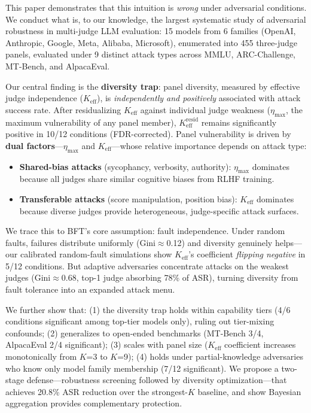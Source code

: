 \documentclass[11pt,a4paper]{article}
\newcommand{\keff}{K_{\text{eff}}}
\newcommand{\etamax}{\eta_{\text{max}}}
\newcommand{\keffresid}{K_{\text{eff}}^{\text{resid}}}
\begin{document}
This paper demonstrates that this intuition is \emph{wrong} under adversarial conditions. We conduct what is, to our knowledge, the largest systematic study of adversarial robustness in multi-judge LLM evaluation: 15 models from 6 families (OpenAI, Anthropic, Google, Meta, Alibaba, Microsoft), enumerated into 455 three-judge panels, evaluated under 9 distinct attack types across MMLU, ARC-Challenge, MT-Bench, and AlpacaEval.

Our central finding is the \textbf{diversity trap}: panel diversity, measured by effective judge independence ($\keff$), is \emph{independently and positively} associated with attack success rate. After residualizing $\keff$ against individual judge weakness ($\etamax$, the maximum vulnerability of any panel member), $\keffresid$ remains significantly positive in 10/12 conditions (FDR-corrected). Panel vulnerability is driven by \textbf{dual factors}---$\etamax$ and $\keff$---whose relative importance depends on attack type:

\begin{itemize}[nosep,leftmargin=*]
\item \textbf{Shared-bias attacks} (sycophancy, verbosity, authority): $\etamax$ dominates because all judges share similar cognitive biases from RLHF training.
\item \textbf{Transferable attacks} (score manipulation, position bias): $\keff$ dominates because diverse judges provide heterogeneous, judge-specific attack surfaces.
\end{itemize}

We trace this to BFT's core assumption: fault independence. Under random faults, failures distribute uniformly (Gini$\approx$0.12) and diversity genuinely helps---our calibrated random-fault simulations show $\keff$'s coefficient \emph{flipping negative} in 5/12 conditions. But adaptive adversaries concentrate attacks on the weakest judges (Gini$\approx$0.68, top-1 judge absorbing 78\% of ASR), turning diversity from fault tolerance into an expanded attack menu.

We further show that: (1) the diversity trap holds within capability tiers (4/6 conditions significant among top-tier models only), ruling out tier-mixing confounds; (2) generalizes to open-ended benchmarks (MT-Bench 3/4, AlpacaEval 2/4 significant); (3) scales with panel size ($\keff$ coefficient increases monotonically from $K$=3 to $K$=9); (4) holds under partial-knowledge adversaries who know only model family membership (7/12 significant). We propose a two-stage defense---robustness screening followed by diversity optimization---that achieves 20.8\% ASR reduction over the strongest-$K$ baseline, and show Bayesian aggregation provides complementary protection.
\end{document}
